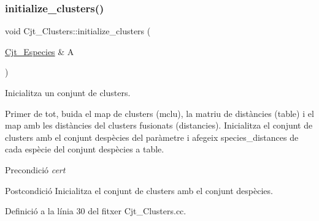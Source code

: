 \subsubsection{\texorpdfstring{initialize\+\_\+clusters()}{initialize\_clusters()}}
{\footnotesize\ttfamily void Cjt\+\_\+\+Clusters\+::initialize\+\_\+clusters (\begin{DoxyParamCaption}\item[{\hyperlink{class_cjt___especies}{Cjt\+\_\+\+Especies} \&}]{A }\end{DoxyParamCaption})}



Inicialitza un conjunt de clusters. 

Primer de tot, buida el map de clusters (mclu), la matriu de distàncies (table) i el map amb les distàncies del clusters fusionats (distancies). Inicialitza el conjunt de clusters amb el conjunt d\textquotesingle{}espècies del paràmetre i afegeix species\+\_\+distances de cada espècie del conjunt d\textquotesingle{}espècies a table.

\begin{DoxyPrecond}{Precondició}
{\itshape cert} 
\end{DoxyPrecond}
\begin{DoxyPostcond}{Postcondició}
Inicialitza el conjunt de clusters amb el conjunt d\textquotesingle{}espècies. 
\end{DoxyPostcond}


Definició a la línia 30 del fitxer Cjt\+\_\+\+Clusters.\+cc.


